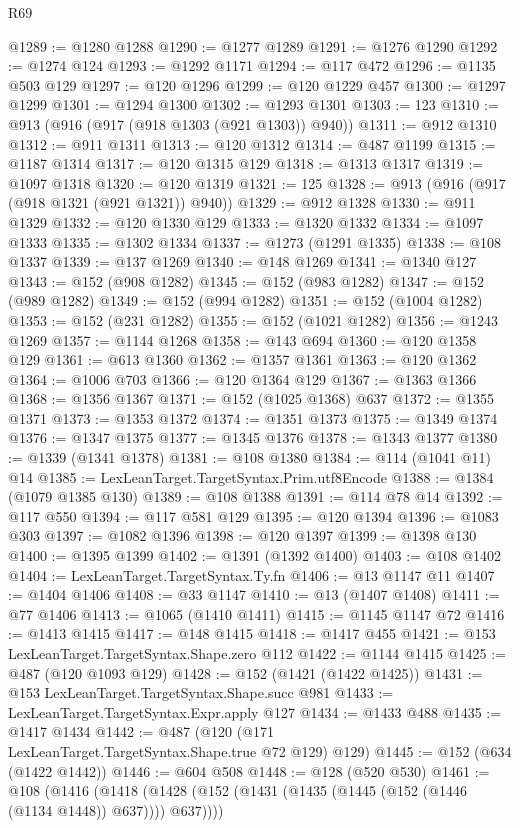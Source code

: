 \begin{lexlean}{R69}
\begin{coremodule}
@1289 := @1280 @1288
@1290 := @1277 @1289
@1291 := @1276 @1290
@1292 := @1274 @124
@1293 := @1292 @1171
@1294 := @117 @472
@1296 := @1135 @503 @129
@1297 := @120 @1296
@1299 := @120 @1229 @457
@1300 := @1297 @1299
@1301 := @1294 @1300
@1302 := @1293 @1301
@1303 := 123
@1310 := @913 (@916 (@917 (@918 @1303 (@921 @1303)) @940))
@1311 := @912 @1310
@1312 := @911 @1311
@1313 := @120 @1312
@1314 := @487 @1199
@1315 := @1187 @1314
@1317 := @120 @1315 @129
@1318 := @1313 @1317
@1319 := @1097 @1318
@1320 := @120 @1319
@1321 := 125
@1328 := @913 (@916 (@917 (@918 @1321 (@921 @1321)) @940))
@1329 := @912 @1328
@1330 := @911 @1329
@1332 := @120 @1330 @129
@1333 := @1320 @1332
@1334 := @1097 @1333
@1335 := @1302 @1334
@1337 := @1273 (@1291 @1335)
@1338 := @108 @1337
@1339 := @137 @1269
@1340 := @148 @1269
@1341 := @1340 @127
@1343 := @152 (@908 @1282)
@1345 := @152 (@983 @1282)
@1347 := @152 (@989 @1282)
@1349 := @152 (@994 @1282)
@1351 := @152 (@1004 @1282)
@1353 := @152 (@231 @1282)
@1355 := @152 (@1021 @1282)
@1356 := @1243 @1269
@1357 := @1144 @1268
@1358 := @143 @694
@1360 := @120 @1358 @129
@1361 := @613 @1360
@1362 := @1357 @1361
@1363 := @120 @1362
@1364 := @1006 @703
@1366 := @120 @1364 @129
@1367 := @1363 @1366
@1368 := @1356 @1367
@1371 := @152 (@1025 @1368) @637
@1372 := @1355 @1371
@1373 := @1353 @1372
@1374 := @1351 @1373
@1375 := @1349 @1374
@1376 := @1347 @1375
@1377 := @1345 @1376
@1378 := @1343 @1377
@1380 := @1339 (@1341 @1378)
@1381 := @108 @1380
@1384 := @114 (@1041 @11) @14
@1385 := LexLeanTarget.TargetSyntax.Prim.utf8Encode
@1388 := @1384 (@1079 @1385 @130)
@1389 := @108 @1388
@1391 := @114 @78 @14
@1392 := @117 @550
@1394 := @117 @581 @129
@1395 := @120 @1394
@1396 := @1083 @303
@1397 := @1082 @1396
@1398 := @120 @1397
@1399 := @1398 @130
@1400 := @1395 @1399
@1402 := @1391 (@1392 @1400)
@1403 := @108 @1402
@1404 := LexLeanTarget.TargetSyntax.Ty.fn
@1406 := @13 @1147 @11
@1407 := @1404 @1406
@1408 := @33 @1147
@1410 := @13 (@1407 @1408)
@1411 := @77 @1406
@1413 := @1065 (@1410 @1411)
@1415 := @1145 @1147 @72
@1416 := @1413 @1415
@1417 := @148 @1415
@1418 := @1417 @455
@1421 := @153 LexLeanTarget.TargetSyntax.Shape.zero @112
@1422 := @1144 @1415
@1425 := @487 (@120 @1093 @129)
@1428 := @152 (@1421 (@1422 @1425))
@1431 := @153 LexLeanTarget.TargetSyntax.Shape.succ @981
@1433 := LexLeanTarget.TargetSyntax.Expr.apply @127
@1434 := @1433 @488
@1435 := @1417 @1434
@1442 := @487 (@120 (@171 LexLeanTarget.TargetSyntax.Shape.true @72 @129) @129)
@1445 := @152 (@634 (@1422 @1442))
@1446 := @604 @508
@1448 := @128 (@520 @530)
@1461 := @108
    (@1416 (@1418 (@1428 (@152 (@1431 (@1435 (@1445 (@152 (@1446 (@1134 @1448)) @637)))) @637))))

\end{coremodule}
\end{lexlean}
